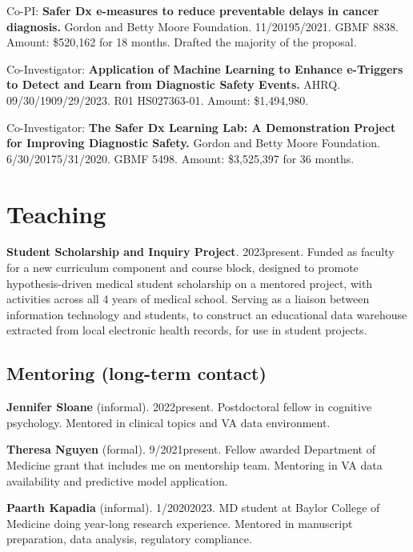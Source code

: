 \documentclass[10pt]{article}
\begin{document}
Co-PI: \textbf{Safer Dx e-measures to reduce preventable delays in
  cancer diagnosis.} Gordon and Betty Moore Foundation.
11/2019\ndash{}5/2021. GBMF 8838. Amount: \$520,162 for 18 months.
Drafted the majority of the proposal.

Co-Investigator: \textbf{Application of Machine Learning to Enhance
  e-Triggers to Detect and Learn from Diagnostic Safety Events.} AHRQ.
09/30/19\ndash{}09/29/2023. R01 HS027363-01. Amount: \$1,494,980.

Co-Investigator: \textbf{The Safer Dx Learning Lab: A Demonstration
  Project for Improving Diagnostic Safety.} Gordon and Betty Moore
Foundation. 6/30/2017\ndash{}5/31/2020. GBMF 5498. Amount: \$3,525,397
for 36 months.




\section*{Teaching}

\textbf{Student Scholarship and Inquiry Project}. 2023\ndash{}present.
Funded as faculty for a new curriculum component and course block,
designed to promote hypothesis-driven medical student scholarship on a
mentored project, with activities across all 4 years of medical
school. Serving as a liaison between information technology and
students, to construct an educational data warehouse extracted from
local electronic health records, for use in student projects.

\subsection*{Mentoring (long-term contact)}

\textbf{Jennifer Sloane} (informal). 2022\ndash{}present. Postdoctoral
fellow in cognitive psychology. Mentored in clinical topics and VA
data environment.

\textbf{Theresa Nguyen} (formal). 9/2021\ndash{}present.
Fellow awarded Department of Medicine grant that includes me on
mentorship team. Mentoring in VA data availability and predictive
model application.

\textbf{Paarth Kapadia} (informal). 1/2020\ndash{}2023. MD student
at Baylor College of Medicine doing year-long research experience.
Mentored in manuscript preparation, data analysis, regulatory
compliance.
\end{document}
